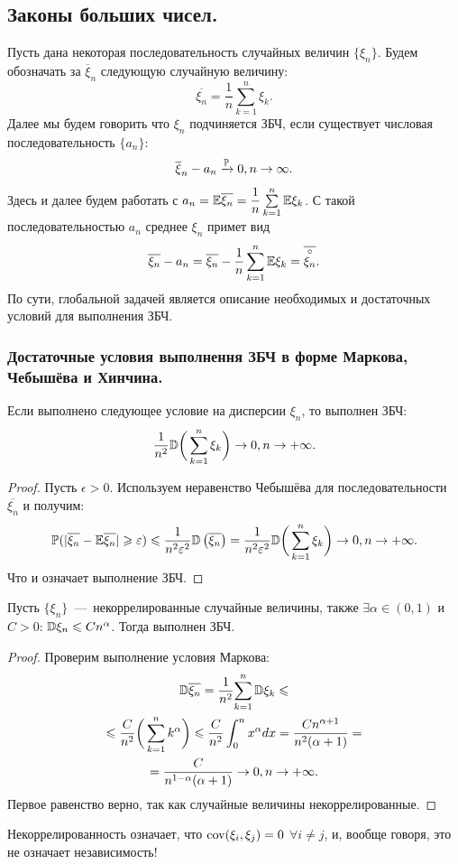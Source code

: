 \subsection{Законы больших чисел.}
Пусть дана некоторая последовательность случайных величин $\{\xi_n\}$.
Будем обозначать за $\overline{\xi}_n$ следующую случайную величину:
\[
    \overline{\xi_n} = \dfrac{1}{n}\sum\limits_{k = 1}^{n}\xi_k.
\]
Далее мы будем говорить что $\xi_n$ подчиняется ЗБЧ, если существует числовая последовательность $\{ a_n \}$:
\[
    \overline{\xi}_n - a_n \xrightarrow{\mathbb{P}} 0, n \rightarrow \infty.
\]
Здесь и далее будем работать с $a_n = \mathbb{E} \overline{\xi_n} = \dfrac{1}{n}\sum\limits_{k = 1}^n \mathbb{E} \xi_k$.
С такой последовательностью $a_n$ среднее $\xi_n$ примет вид
\[
    \overline{\xi_n} - a_n = \overline{\xi_n} - \dfrac{1}{n}\sum\limits_{k = 1}^{n} \mathbb{E} \xi_k = \overline{\overset{\circ}{\xi_n}}.
\]
По сути, глобальной задачей является описание необходимых и достаточных условий для выполнения ЗБЧ.
\subsubsection{Достаточные условия выполнення ЗБЧ в форме Маркова, Чебышёва и Хинчина.}
\begin{theorem}
    Если выполнено следующее условие на дисперсии $\xi_n$, то выполнен ЗБЧ:
    \[
        \dfrac{1}{n^2}\mathbb{D}\biggr(\sum\limits_{k = 1}^{n} \xi_k\biggr) \rightarrow 0, n \rightarrow +\infty.
    \]
\end{theorem}
\begin{proof}
    Пусть $\epsilon > 0$.
    Используем неравенство Чебышёва для последовательности $\overline{{\xi_n}}$ и получим:
    \[
        \mathbb{P}(|\overline{\xi_n} - \mathbb{E} \overline{\xi_n}| \geqslant \varepsilon) \leqslant \dfrac{1}{n^2\varepsilon^2}{\mathbb{D}\left( \overline{\xi_n}\right)} = \dfrac{1}{n^2\varepsilon^2}{\mathbb{D}\biggr( \sum\limits_{k = 1}^{n} \xi_k \biggr)} \rightarrow 0, n \rightarrow +\infty.
    \]
    Что и означает выполнение ЗБЧ.
\end{proof}
\begin{corollary}
    Пусть $\{\xi_n\}$~---~некоррелированные случайные величины, также $\exists \alpha \in (0, 1)$ и $C > 0$: $\mathbb{D} \xi_n \leqslant C n^{\alpha}$. Тогда выполнен ЗБЧ.
\end{corollary}
\begin{proof}
    Проверим выполнение условия Маркова:
    \begin{multline*}
        {\mathbb{D}\overline{\xi_n}} = \dfrac{1}{n^2}{\sum\limits_{k = 1}^n \mathbb{D}\xi_k} \leqslant \\ \leqslant \dfrac{C}{n^2}\biggr(\sum\limits_{k = 1}^{n} k^\alpha\biggr) \leqslant \dfrac{C}{n^2}\int_0^{n} x^{\alpha} dx = \dfrac{C n^{\alpha + 1}}{n^2 (\alpha + 1)} = \\ = \dfrac{C}{n^{1 - \alpha}(\alpha + 1)} \rightarrow 0, n \rightarrow +\infty.
    \end{multline*}
    Первое равенство верно, так как случайные величины некоррелированные.
\end{proof}
\begin{reminder}
    Некоррелированность означает, что $\operatorname{cov} (\xi_i, \xi_j) = 0$ $\forall i \neq j$, и, вообще говоря, это не означает независимость!
\end{reminder}


